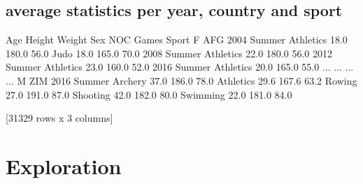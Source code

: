 \documentclass[letterpaper,10pt,english]{jupyterBook}
\begin{document}
\subsection{average statistics per year, country and sport}
\label{\detokenize{c7_case_studies/Olympics:average-statistics-per-year-country-and-sport}}
\begin{sphinxVerbatim}[commandchars=\\\{\}]
  \PYG{p}{[}   \PYG{p}{]}\PYG{p}{[}\PYG{p}{[}  \PYG{p}{]}\PYG{p}{]}
\end{sphinxVerbatim}

\begin{sphinxVerbatim}[commandchars=\\\{\}]
                                Age  Height  Weight
Sex NOC Games       Sport                          
F   AFG 2004 Summer Athletics  18.0   180.0    56.0
                    Judo       18.0   165.0    70.0
        2008 Summer Athletics  22.0   180.0    56.0
        2012 Summer Athletics  23.0   160.0    52.0
        2016 Summer Athletics  20.0   165.0    55.0
...                             ...     ...     ...
M   ZIM 2016 Summer Archery    37.0   186.0    78.0
                    Athletics  29.6   167.6    63.2
                    Rowing     27.0   191.0    87.0
                    Shooting   42.0   182.0    80.0
                    Swimming   22.0   181.0    84.0

[31329 rows x 3 columns]
\end{sphinxVerbatim}


\section{Exploration}
\label{\detokenize{c7_case_studies/Olympics:exploration}}
\end{document}
